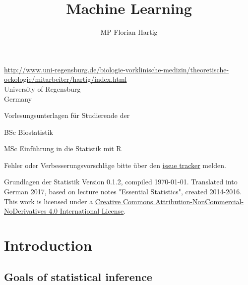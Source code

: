 \documentclass[a4paper,twoside]{tufte-book}\usepackage[]{graphicx}\usepackage[]{color}
\title{Machine Learning}
\author{MP Florian Hartig}
\begin{document}

\let\cleardoublepage\clearpage %
\maketitle


\thispagestyle{empty}
\null


\href{Prof. Dr. Florian Hartig}{http://www.uni-regensburg.de/biologie-vorklinische-medizin/theoretische-oekologie/mitarbeiter/hartig/index.html}\\
University of Regensburg\\
Germany\\[0.5cm]

\begin{fullwidth}
Vorlesungsunterlagen für Studierende der

\begin{itemize*}
  \item BSc Biostatistik
  \item MSc Einführung in die Statistik mit R
\end{itemize*}

\vspace{0.5cm}

Fehler oder Verbesserungsvorschläge bitte über den \href{https://github.com/TheoreticalEcology/machinelearning/issues}{issue tracker} melden. 

\end{fullwidth}


\vfill
\begin{fullwidth}
Grundlagen der Statistik Version 0.1.2, compiled \today. Translated into German 2017, based on lecture notes "Essential Statistics", created 2014-2016. This work is licensed under a \href{https://creativecommons.org/licenses/by-nc-nd/4.0/}{Creative Commons Attribution-NonCommercial-NoDerivatives 4.0 International License}. 
\end{fullwidth}


\newpage
\tableofcontents

\chapter{Introduction} %

\section{Goals of statistical inference}
\end{document}
